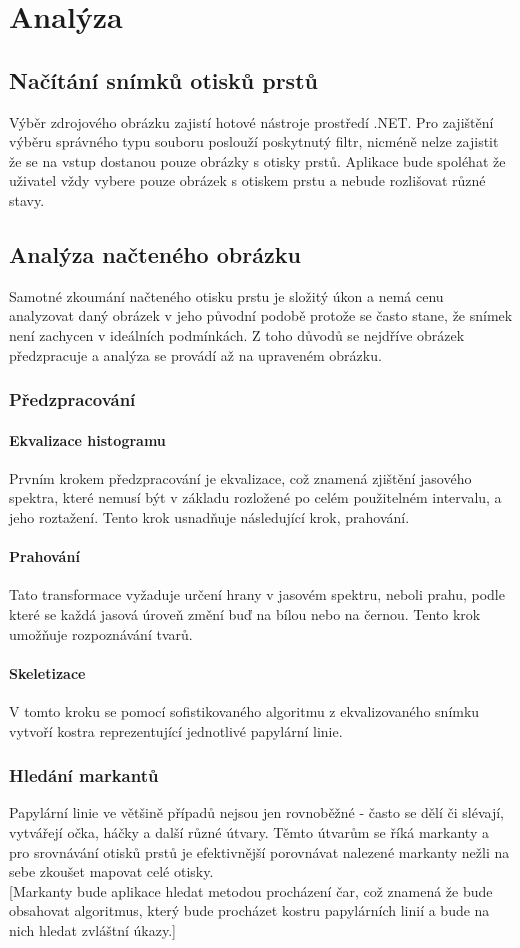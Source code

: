 \documentclass[12pt,a4paper]{article}
\let\oldsection\section
\renewcommand\section{\clearpage\oldsection}
\begin{document}
\section{Analýza}
\subsection{Načítání snímků otisků prstů}
Výběr zdrojového obrázku zajistí hotové nástroje prostředí .NET. Pro zajištění výběru správného typu souboru poslouží poskytnutý filtr, nicméně nelze zajistit že se na vstup dostanou pouze obrázky s otisky prstů. Aplikace bude spoléhat že uživatel vždy vybere pouze obrázek s otiskem prstu a nebude rozlišovat různé stavy.
\subsection{Analýza načteného obrázku}
Samotné zkoumání načteného otisku prstu je složitý úkon a nemá cenu analyzovat daný obrázek v jeho původní podobě protože se často stane, že snímek není zachycen v ideálních podmínkách. Z toho důvodů se nejdříve obrázek předzpracuje a analýza se provádí až na upraveném obrázku.
\subsubsection{Předzpracování}
\paragraph{Ekvalizace histogramu}
Prvním krokem předzpracování je ekvalizace, což znamená zjištění jasového spektra, které nemusí být v základu rozložené po celém použitelném intervalu, a jeho roztažení. Tento krok usnadňuje následující krok, prahování.
\paragraph{Prahování}
Tato transformace vyžaduje určení hrany v jasovém spektru, neboli prahu, podle které se každá jasová úroveň změní buď na bílou nebo na černou. Tento krok umožňuje rozpoznávání tvarů.
\paragraph{Skeletizace}
V tomto kroku se pomocí sofistikovaného algoritmu z ekvalizovaného snímku vytvoří kostra reprezentující jednotlivé papylární linie.
\subsubsection{Hledání markantů}
Papylární linie ve většině případů nejsou jen rovnoběžné - často se dělí či slévají, vytvářejí očka, háčky a další různé útvary. Těmto útvarům se říká markanty a pro srovnávání otisků prstů je efektivnější porovnávat nalezené markanty nežli na sebe zkoušet mapovat celé otisky. \\
{[}Markanty bude aplikace hledat metodou procházení čar, což znamená že bude obsahovat algoritmus, který bude procházet kostru papylárních linií a bude na nich hledat zvláštní úkazy.{]}
\end{document}
